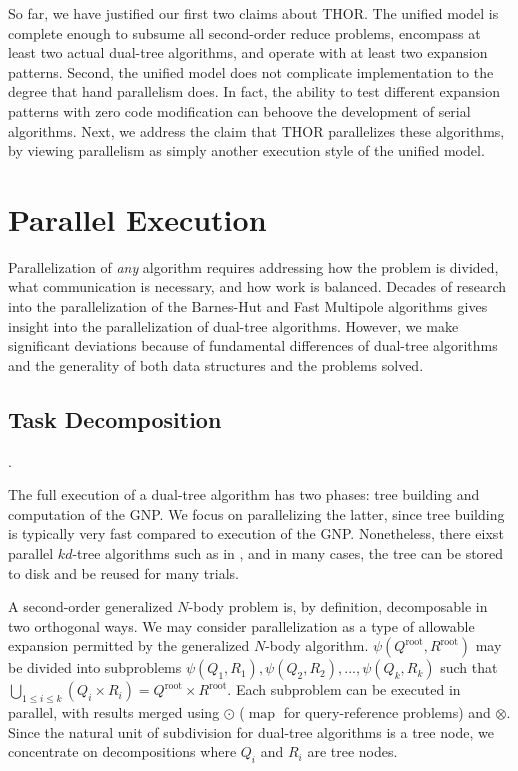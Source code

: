 \documentclass[twoside,leqno,twocolumn]{article}
\newcommand{\Union}{\bigcup}
\DeclareMathOperator*{\map}{map}
\newcommand{\gnp}{\psi}
\newcommand{\mysub}[1]{\subsection{#1}. }
\newcommand{\kdroot}[1]{#1^{\text{root}}}
\begin{document}
So far, we have justified our first two claims about THOR.
The unified model is complete enough to subsume all second-order reduce problems, encompass at least two actual dual-tree algorithms, and operate with at least two expansion patterns.
Second, the unified model does not complicate implementation to the degree that hand parallelism does.
In fact, the ability to test different expansion patterns with zero code modification can behoove the development of serial algorithms.
Next, we address the claim that THOR parallelizes these algorithms, by viewing parallelism as simply another execution style of the unified model.

\section{Parallel Execution}

Parallelization of {\em any} algorithm requires addressing how the problem is divided, what communication is necessary, and how work is balanced.
Decades of research into the parallelization of the Barnes-Hut and Fast Multipole algorithms gives insight into the parallelization of dual-tree algorithms.
However, we make significant deviations because of fundamental differences of dual-tree algorithms and the generality of both data structures and the problems solved.

\mysub{Task Decomposition}

The full execution of a dual-tree algorithm has two phases: tree building and computation of the GNP.
We focus on parallelizing the latter, since tree building is typically very fast compared to execution of the GNP.
Nonetheless, there eixst parallel $kd$-tree algorithms such as in \cite{alfuraih00parallel}, and in many cases, the tree can be stored to disk and be reused for many trials.

A second-order generalized $N$-body problem is, by definition, decomposable in two orthogonal ways.
We may consider parallelization as a type of allowable expansion permitted by the generalized $N$-body algorithm.
$\gnp(\kdroot{Q}, \kdroot{R})$ may be divided into subproblems $\gnp(Q_1,R_1), \gnp(Q_2,R_2), ..., \gnp(Q_k, R_k)$ such that $\Union_{1 \leq i \leq k} (Q_i \times R_i) = \kdroot{Q} \times \kdroot{R}$.
Each subproblem can be executed in parallel, with results merged using $\odot$ ($\map$ for query-reference problems) and $\otimes$.
Since the natural unit of subdivision for dual-tree algorithms is a tree node, we concentrate on decompositions where $Q_i$ and $R_i$ are tree nodes.
\end{document}
